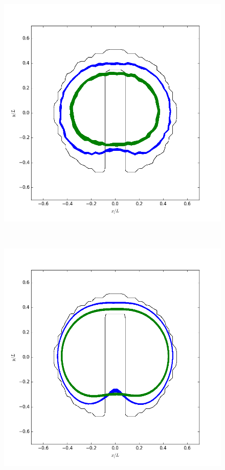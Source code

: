 \documentclass{ws-ijcm}
\begin{document}
\begin{figure}
\begin{minipage}{0.45\textwidth}
      \includegraphics[width=\textwidth]{contours_flip}
  \end{minipage} \\
  \begin{minipage}{0.45\textwidth}
      \includegraphics[width=\textwidth]{contours_full}

\end{minipage}
\end{figure}
\end{document}
